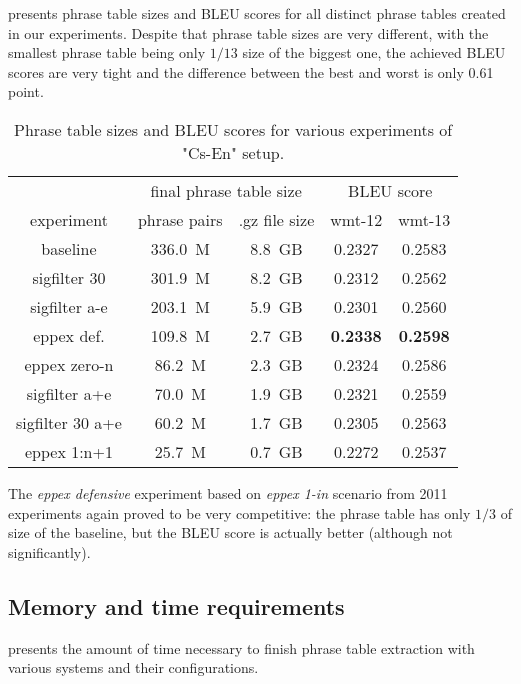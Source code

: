  presents phrase table sizes and BLEU scores for all
distinct phrase tables created in our experiments.
Despite that phrase table sizes are very different, with the smallest phrase table being only
$1/13$ size of the biggest one, the achieved BLEU scores are very tight and the difference
between the best and worst is only 0.61 point.

\begin{table}[ht]
\centering
\begin{tabular}{ | c | c c | c c | }
\hline
 & \multicolumn{2}{|c|}{final phrase table size} & \multicolumn{2}{|c|}{BLEU score} \\
experiment & phrase pairs & .gz file size & wmt-12 & wmt-13 \\
\hline
\hline
baseline          & 336.0~M & 8.8~GB & 0.2327 & 0.2583 \\
sigfilter 30      & 301.9~M & 8.2~GB & 0.2312 & 0.2562 \\
sigfilter a-e     & 203.1~M & 5.9~GB & 0.2301 & 0.2560 \\
eppex def.        & 109.8~M & 2.7~GB & \textbf{0.2338} & \textbf{0.2598} \\
eppex zero-n      &  86.2~M & 2.3~GB & 0.2324 & 0.2586 \\
sigfilter a+e     &  70.0~M & 1.9~GB & 0.2321 & 0.2559 \\
sigfilter 30 a+e  &  60.2~M & 1.7~GB & 0.2305 & 0.2563 \\
eppex 1:n+1       &  25.7~M & 0.7~GB & 0.2272 & 0.2537 \\
\hline
\end{tabular}
\caption{\label{cs-en-wmt13-pt-size-and-bleu}
Phrase table sizes and BLEU scores for various experiments of "Cs-En" setup.}
\end{table}

The \emph{eppex defensive} experiment based on \emph{eppex 1-in} scenario from 2011 experiments
again proved to be very competitive: the phrase table has only $1/3$ of size of the baseline,
but the BLEU score is actually better (although not significantly).

\subsection{Memory and time requirements}

 presents the amount of time necessary to finish
phrase table extraction with various systems and their configurations.

